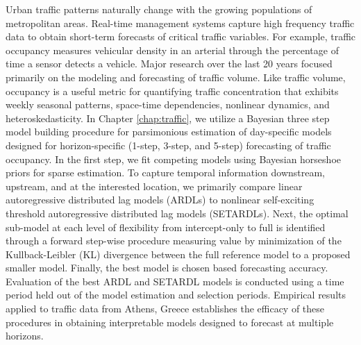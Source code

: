 Urban traffic patterns naturally change with the growing populations of metropolitan areas. Real-time management systems capture high frequency traffic data to obtain short-term forecasts of critical traffic variables.  For example, traffic occupancy measures vehicular density in an arterial through the percentage of time a sensor detects a vehicle. Major research over the last 20 years focused primarily on the modeling and forecasting of traffic volume. Like traffic volume,  occupancy is a useful metric for quantifying traffic concentration that exhibits weekly seasonal patterns, space-time dependencies, nonlinear dynamics, and heteroskedasticity. In Chapter \ref{chap:traffic}, we utilize a Bayesian three step model building procedure for parsimonious estimation of day-specific models designed for horizon-specific (1-step, 3-step, and 5-step) forecasting of traffic occupancy. In the first step, we fit competing models using Bayesian horseshoe priors for sparse estimation. To capture temporal information downstream, upstream, and at the interested location, we primarily compare linear autoregressive distributed lag models (ARDLs) to nonlinear self-exciting threshold autoregressive distributed lag models (SETARDLs).  Next, the optimal sub-model at each level of flexibility from intercept-only to full is identified through a forward step-wise procedure measuring value by minimization of the Kullback-Leibler (KL) divergence between the full reference model to a proposed smaller model. Finally, the best model is chosen based forecasting accuracy. Evaluation of the best ARDL and SETARDL models is conducted using a time period held out of the model estimation and selection periods. Empirical results applied to traffic data from Athens, Greece establishes the efficacy of these procedures in obtaining interpretable models designed to forecast at multiple horizons.

